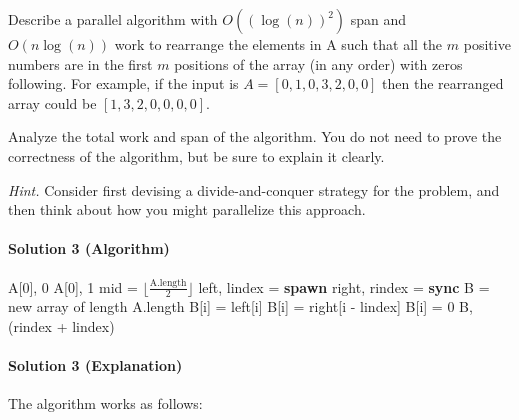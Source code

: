 \documentclass[11pt]{article}
\begin{document}
Describe a parallel algorithm with $O((\log(n))^2)$ span and $O(n \log(n))$ work to rearrange the elements in A such that all the $m$ positive numbers are in the first $m$ positions of the array (in any order) with zeros following. For example, if the input is $A = [0, 1, 0, 3, 2, 0, 0]$ then the rearranged array could be $[1, 3, 2, 0, 0, 0, 0]$.

Analyze the total work and span of the algorithm. You do not need to prove the correctness of the algorithm, but be sure to explain it clearly.

\textit{Hint.} Consider first devising a divide-and-conquer strategy for the problem, and then think about how you might parallelize this approach.

\paragraph{Solution 3 (Algorithm)}

\begin{algorithmic}[1]
                \State \Return A[0], 0 
            \Else
                \State \Return A[0], 1 
            \EndIf
        \EndIf
        \State mid = $\lfloor \frac{\text{A.length}}{2} \rfloor$
        \State left, lindex = \textbf{spawn}  
        \State right, rindex =  
        \State \textbf{sync}
        \State B = new array of length A.length
         
            \State B[i] = left[i]
        \EndFor
            \State B[i] = right[i - lindex]
        \EndFor
            \State B[i] = 0
        \EndFor
        \State \Return B, (rindex + lindex)
    \EndProcedure
\end{algorithmic}

\paragraph{Solution 3 (Explanation)}

The algorithm works as follows:
\end{document}
